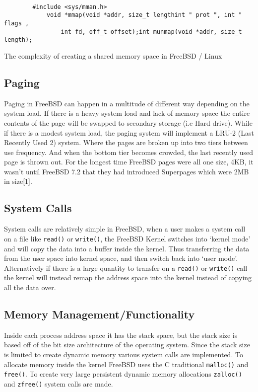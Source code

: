 \documentclass{article}
\begin{document}
		\begin{lstlisting}

		#include <sys/mman.h>
            void *mmap(void *addr, size_t lengthint " prot ", int " flags ,
                int fd, off_t offset);int munmap(void *addr, size_t length);
		\end{lstlisting}
		The complexity of creating a shared memory space in FreeBSD / Linux
\subsection{Paging}
		Paging in FreeBSD can happen in a multitude of different way depending on the system load. If there is a heavy system load and lack of memory space the entire contents of the page will be swapped to secondary storage (i.e Hard drive). While if there is a modest system load, the paging system will implement a LRU-2 (Last Recently Used 2) system. Where the pages are broken up into two tiers between use frequency. And when the bottom tier becomes crowded, the last recently used page is thrown out. For the longest time FreeBSD pages were all one size, 4KB, it wasn’t until FreeBSD 7.2 that they had introduced Superpages which were 2MB in size[1].

\subsection{System Calls}
		System calls are relatively simple in FreeBSD, when a user makes a system call on a file like \texttt{read()} or \texttt{write()}, the FreeBSD Kernel switches into ‘kernel mode’ and will copy the data into a buffer inside the kernel. Thus transferring the data from the user space into kernel space, and then switch back into ‘user mode’. Alternatively if there is a large quantity to transfer on a \texttt{read()} or \texttt{write()} call the kernel will instead remap the address space into the kernel instead of copying all the data over.

\subsection{Memory Management/Functionality}
        Inside each process address space it has the stack space, but the stack size is based off of the bit size architecture of the operating system. Since the stack size is limited to create dynamic memory various system calls are implemented. To allocate memory inside the kernel FreeBSD uses the C traditional \texttt{malloc()} and \texttt{free()}. To create very large persistent dynamic memory allocations \texttt{zalloc()} and \texttt{zfree()} system calls are made.
\end{document}
